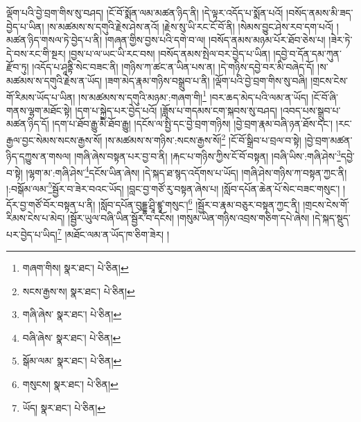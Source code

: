 ལྡོག་པའི་བྱེ་བྲག་གིས་སུ་བཤད། །ངོ་བོ་སྨོན་ལམ་མཚན་ཉིད་ནི། །དེ་ལྟར་འདོད་པ་སྨོན་པའོ། །བསོད་ནམས་མི་ཟད་བྱེད་པ་ཡིན། །ས་མཚམས་ས་དགུའི་རྗེས་ཤེས་ནའོ། །རྗེས་སུ་ཡི་རང་ངོ་བོ་ནི། །སེམས་བྱུང་ཤེས་རབ་དག་པའོ། །མཚན་ཉིད་གསལ་ཏེ་བྱེད་པ་ནི། །གཞན་གྱིས་བྱས་པའི་དགེ་བ་ལ། །བསོད་ནམས་མཉམ་པོར་ཐོབ་ཅེས་པ། །ཟེར་ཏེ་དེ་བས་རང་གི་སྔར། །བྱས་པ་ལ་ཡང་ཡི་རང་བས། །བསོད་ནམས་སྤེལ་བར་བྱེད་པ་ཡིན། །དབྱེ་བ་དོན་དམ་ཀུན་རྫོབ་ཏུ། །འདོད་པ་ཤཱནྟི་སེང་བཟང་ནི། །གཉིས་ཀ་ཚང་ན་ཡིན་པས་ན། །དེ་གཉིས་དབྱེ་བར་མི་བཞེད་དོ། །ས་མཚམས་ས་དགུའི་རྗེས་ན་ཡོད། །ཟག་མེད་རྣམ་གཉིས་བསྒྲུབ་པ་ནི། །ལྡོག་པའི་བྱེ་བྲག་གིས་སུ་བཞི། །གྲངས་ངེས་གོ་རིམས་ཡོད་པ་ཡིན། །ས་མཚམས་ས་དགུའི་མཉམ་:གཞག་གི།\footnote{གཞག་གིས།  སྣར་ཐང་།  པེ་ཅིན། } །བར་ཆད་མེད་པའི་ལམ་ན་ཡོད། །ངོ་བོ་ཞི་གནས་ལྷག་མཐོང་སྟེ། །དག་པ་སྐྱེད་པར་བྱེད་པའོ། །ཟློས་པ་གདམས་ངག་སྐབས་སུ་བཤད། །འབད་པས་སྒྲུབ་པ་མཚན་ཉིད་དོ། །དག་པ་ཐོབ་རྒྱུ་མི་ཐོབ་རྒྱུ། །དངོས་ལ་སྤྱི་དང་བྱེ་བྲག་གཉིས། །བྱེ་བྲག་རྣམ་བཞི་ཉན་ཐོས་དང་། །རང་རྒྱལ་བྱང་སེམས་སངས་རྒྱས་སོ། །ས་མཚམས་ས་གཉིས་:སངས་རྒྱས་སོ།\footnote{སངས་རྒྱས་ས།  སྣར་ཐང་།  པེ་ཅིན། } །ངོ་བོ་སྒྲིབ་པ་བྲལ་བ་སྟེ། །བྱེ་བྲག་མཚན་ཉིད་དཀྱུས་ན་གསལ། །གཞི་ཞེས་བསྟན་པར་བྱ་བ་ནི། །རྐང་པ་གཉིས་ཀྱིས་ངོ་བོ་བསྟན། །བཞི་ཡིས་:གཞི་ཤེས་\footnote{གཞི་ཞེས་  སྣར་ཐང་།  པེ་ཅིན། }དབྱེ་བ་སྟེ། །ལྷག་མ་:གཞི་ཤེས་\footnote{བཞི་ཞེས་  སྣར་ཐང་།  པེ་ཅིན། }དངོས་ཡིན་ཞེས། །དེ་སྐད་ཐ་སྙད་འདོགས་པ་ཡོད། །གཞི་ཤེས་གཉིས་ཀ་བསྟན་ཀྱང་ནི། །:བསྒོམ་ལམ་\footnote{སྒོམ་ལམ་  སྣར་ཐང་།  པེ་ཅིན། }སྦྱོར་བ་ཟེར་བའང་ཡོད། །བླང་བྱ་གཙོ་རུ་བསྟན་ཞེས་པ། །སློབ་དཔོན་ཆེན་པོ་སེང་བཟང་གསུང་། །དོར་བྱ་གཙོ་བོར་བསྟན་པ་ནི། །སློབ་དཔོན་བུདྡྷ་ཤྲཱི་ཛྙཱ་གསུང་།\footnote{གསུངས།  སྣར་ཐང་།  པེ་ཅིན། } །སྦྱོར་བ་རྣམ་བཅུར་བསྟན་ཀྱང་ནི། །གྲངས་ངེས་གོ་རིམས་ངེས་པ་མེད། །སྦྱོར་ཡུལ་བཞི་ཡིན་སྦྱོར་བ་དངོས། །གསུམ་ཡིན་གཉིས་འབྲས་གཅིག་དཔེ་ཞེས། །དེ་སྐད་སྡུད་པར་བྱེད་པ་ཡིད།\footnote{ཡོད།  སྣར་ཐང་།  པེ་ཅིན། } །མཐོང་ལམ་ན་ཡོད་ཁ་ཅིག་ཟེར། །
